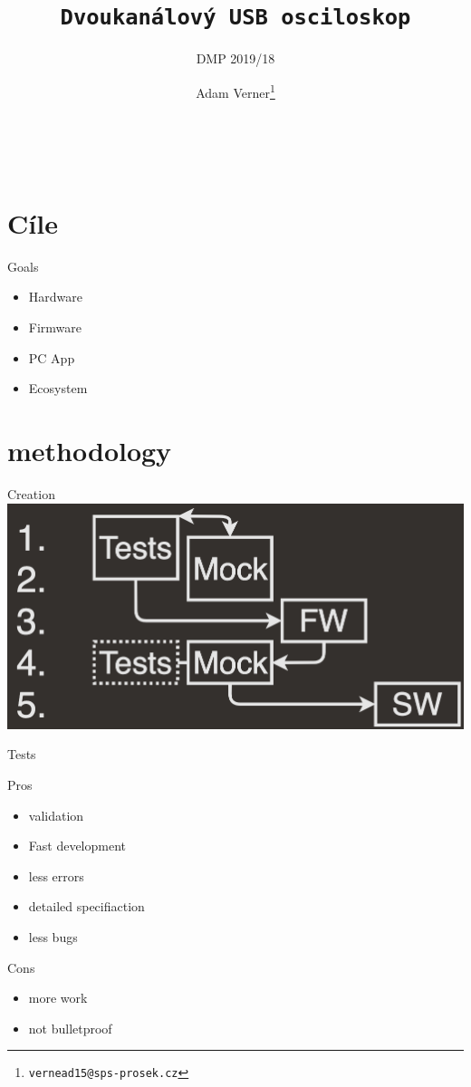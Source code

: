 \documentclass{beamer}
\title{\texttt{\LARGE Dvoukanálový USB osciloskop}}
\subtitle{ DMP 2019/18 }
\author{ Adam Verner\footnote{\texttt{vernead15@sps-prosek.cz}}}
\begin{document}
\begin{frame}
	\maketitle \\
\end{frame}
	
\section{Cíle}

	\begin{frame}{Goals}
		\begin{itemize}
			\item Hardware
			\item Firmware
			\item PC App
			\item Ecosystem
		\end{itemize}
	\end{frame}

\section{methodology}

	\begin{frame}{Creation}
		\includegraphics[width=0.9\paperwidth]{Iterations.png}
	\end{frame}

	\begin{frame}{Tests}

		Pros
		\begin{itemize}
			\item validation
			\item Fast development
			\item less errors
			\item detailed specifiaction
			\item less bugs
		\end{itemize}

		Cons
		\begin{itemize}
			\item more work
			\item not bulletproof
		\end{itemize}

	\end{frame}
	
\end{document}
